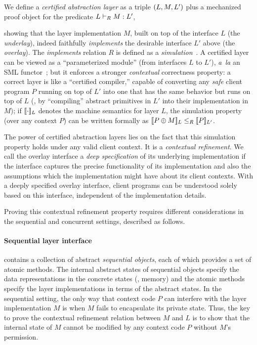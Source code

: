 We define a {\em certified abstraction
  layer} as a triple $\layer{L}{M}{L'}$ plus a mechanized
proof object for the predicate $\ltyp{L}{R}{M}{L'}$, 
showing that the layer
implementation $M$, built on top of the interface $L$ (the {\em
  underlay}), indeed faithfully {\em implements} the desirable
interface $L'$ above (the {\em overlay}).  The {\em implements}
relation $R$ is defined as a {\em simulation}~\cite{Lynch95}.
A certified layer can be
viewed as a ``parameterized module'' (from interfaces $L$ to $L'$),
{\em a~la} an SML functor~\cite{milner97};
 but it enforces a stronger {\em contextual} correctness property: a correct
layer is like a ``certified compiler,'' capable of converting any {\em
  safe} client program $P$ running on top of $L'$ into one that has the
same behavior but runs on top of $L$ (\eg, by ``compiling'' abstract
primitives in $L'$ into their implementation in $M$); if
$\sem{L}{\cdot}$ denotes the machine semantics for layer $L$, the
simulation property (over any context $P$) can be written formally as $\sem{L}{P\oplus{}M} \leq_R \sem{L'}{P}$.

The power of certified abstraction layers lies on the fact that this
simulation property holds under any valid client context. It is a {\em
  contextual refinement}. We call the overlay interface a {\em deep
  specification} of its underlying implementation if the interface
captures the precise functionality of its
implementation and also the assumptions which the
implementation might have about its client contexts. With a deeply
specified overlay interface, client programs can be understood solely
based on this interface, independent of the implementation details.

Proving this contextual refinement property requires different
considerations in the sequential and concurrent settings, described as follows.

\paragraph{Sequential layer interface}
 contains a  collection of abstract 
\emph{sequential objects}, each of which provides a
set of atomic methods.
The internal abstract states of sequential objects
specify the data representations in the concrete states
(\eg, memory)
and the atomic methods
specify the layer implementations
in terms of the abstract states.
In the sequential setting, the only way that context code $P$ can 
 interfere with the 
layer implementation $M$ is when
$M$ fails to encapsulate its private state.
Thus, the key to prove the 
 contextual refinement relation
between $M$ and $L$ is to show that
the internal state of $M$  cannot be modified
by  any context code $P$ 
without $M$'s permission.


